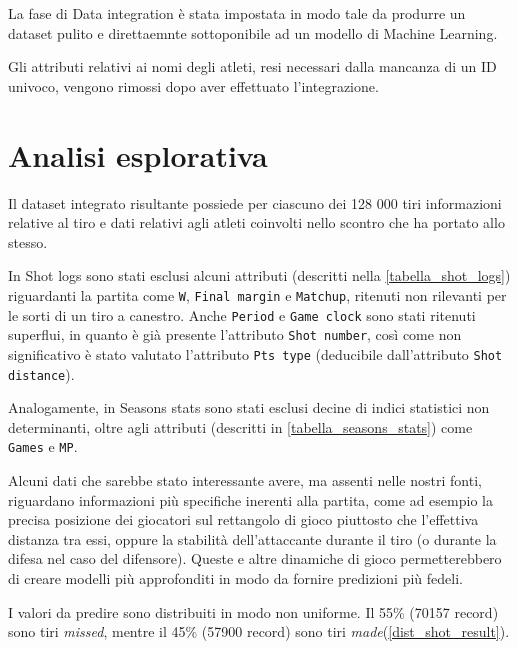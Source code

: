 La fase di Data integration è stata impostata in modo tale da produrre un dataset pulito e direttaemnte sottoponibile ad un modello di Machine Learning.

Gli attributi relativi ai nomi degli atleti, resi necessari dalla mancanza di un ID univoco, vengono rimossi dopo aver effettuato l'integrazione.

\section{Analisi esplorativa}

\par
Il dataset integrato risultante possiede per ciascuno dei 128 000 tiri informazioni relative al tiro e dati relativi agli atleti coinvolti nello scontro che ha portato allo stesso.
\par

In Shot logs sono stati esclusi alcuni attributi (descritti nella \autoref{tabella_shot_logs}) riguardanti la partita come \texttt{W}, \texttt{Final margin} e \texttt{Matchup}, ritenuti non rilevanti per le sorti di un tiro a canestro.
Anche \texttt{Period} e \texttt{Game clock} sono stati ritenuti superflui, in quanto è già presente l'attributo \texttt{Shot number}, così come non significativo è stato valutato l'attributo \texttt{Pts type} (deducibile dall'attributo \texttt{Shot distance}). 
\par
Analogamente, in Seasons stats sono stati esclusi decine di indici statistici non determinanti, oltre agli attributi (descritti in \autoref{tabella_seasons_stats}) come \texttt{Games} e \texttt{MP}.

\par

Alcuni dati che sarebbe stato interessante avere, ma assenti nelle nostri fonti, riguardano informazioni più specifiche inerenti alla partita, come ad esempio la precisa posizione dei giocatori sul rettangolo di gioco piuttosto che l’effettiva distanza tra essi, oppure la stabilità dell’attaccante durante il tiro (o durante la difesa nel caso del difensore). Queste e altre dinamiche di gioco permetterebbero di creare modelli più approfonditi in modo da fornire predizioni più fedeli.

\par
I valori da predire sono distribuiti in modo non uniforme. Il 55\% (70157 record) sono tiri \textit{missed}, mentre il 45\% (57900 record) sono tiri \textit{made}(\autoref{dist_shot_result}).

